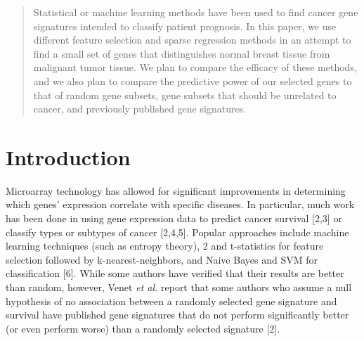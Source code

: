 \documentclass[11pt]{article}
\begin{document}
\maketitle

\begin{abstract}
Statistical or machine learning methods have been used to find cancer gene signatures intended to classify patient prognosis. In this paper, we use different feature selection and sparse regression methods in an attempt to find a small set of genes that distinguishes normal breast tissue from malignant tumor tissue. We plan to compare the efficacy of these methods, and we also plan to compare the predictive power of our selected genes to that of random gene subsets, gene subsets that should be unrelated to cancer, and previously published gene signatures.



\end{abstract}

\section{Introduction}

Microarray technology has allowed for significant improvements in determining which genes' expression correlate with specific diseases. In particular, much work has been done in using gene expression data to predict cancer survival [2,3] or classify types or subtypes of cancer [2,4,5]. Popular approaches include machine learning techniques (such as entropy theory), 2 and t-statistics for feature selection followed by k-nearest-neighbors, and Naive Bayes and SVM for classification [6]. While some authors have verified that their results are better than random, however, Venet \emph{et al.} report that some authors who assume a null hypothesis of no association between a randomly selected gene signature and survival have published gene signatures that do not perform significantly better (or even perform worse) than a randomly selected signature [2].%
\end{document}
